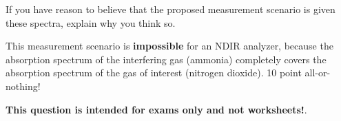 \vskip 10pt

If you have reason to believe that the proposed measurement scenario is  given these spectra, explain why you think so.








This measurement scenario is {\bf impossible} for an NDIR analyzer, because the absorption spectrum of the interfering gas (ammonia) completely covers the absorption spectrum of the gas of interest (nitrogen dioxide).  10 point all-or-nothing!







{\bf This question is intended for exams only and not worksheets!}.



